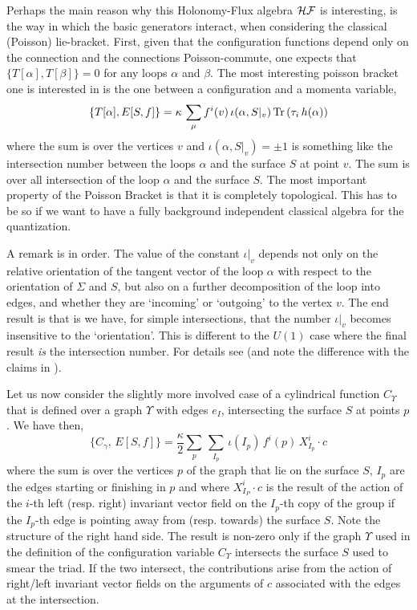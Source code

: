 \documentclass[aps,prd,tightenlines,showpacs,nofootinbib,preprint]{revtex4}
\def\be{\begin{equation}}
\def\ee{\end{equation}}
\def\g{{\gamma}}  \def\a{{\alpha}} \def\l{{\lambda}}
\begin{document}
Perhaps the main reason why this Holonomy-Flux  algebra
${\cal HF}$ is interesting, is the way in which the basic
generators interact, when considering the classical (Poisson)
lie-bracket. First, given that the configuration functions depend
only on the connection and the connections Poisson-commute, one
expects that $\{T[\a],T[\beta]\}=0$ for any loops $\a$ and
$\beta$. The most interesting poisson bracket one is interested in
is the one between a configuration and a momenta variable,
%
\be \{T[\a],E[S,f]\}= \kappa\,\sum_\mu
f^i(v)\,\iota(\a,S|_{v})\,{\rm Tr} \,(\tau_i\, h(\a))
\label{poissonB}
 \ee
%
where the sum is over the vertices $v$ and
$\iota(\a,S|_{v})=\pm 1$ is something like the
intersection number between the loops $\a$ and the surface $S$ at
point $v$. The sum is over all intersection of the loop $\a$
and the surface $S$. The most important property of the Poisson
Bracket is that it is completely topological. This has to be so if
we want to have a fully background independent classical algebra
for the quantization.

A remark is in order. The value of the constant $\iota|_{v}$
depends not only on the relative orientation of the tangent vector
of the loop $\a$ with respect to the orientation of $\Sigma$ and
$S$, but also on a further decomposition of the loop into edges,
and whether they are `incoming' or `outgoing' to the vertex
$v$. The end result is that is we have, for simple
intersections, that the number $\iota|_{v}$ becomes insensitive
to the `orientation'. This is different to the $U(1)$ case where
the final result {\it is} the intersection number. For details see
\cite{ACZ} (and note the difference with the claims in
\cite{Nicolai:2005mc}).

Let us now consider the slightly more involved case of a
cylindrical function $C_\Upsilon$ that is defined over a graph
$\Upsilon$ with edges $e_I$, intersecting the surface $S$ at
points $p$. We have then,
%
\be \{ C_\g, \, E[S,f] \} = \frac{\kappa}{2} \sum_{p}\,
\sum_{I_p}\, \iota({I_p})\, f^i(p)\, X^i_{I_p}\cdot c
\label{poissonbb}
 \ee
%
where the sum is over the vertices $p$ of the graph that lie on
the surface $S$, $I_p$ are the edges starting or finishing in $p$
and where $X^i_{I_P}\cdot c$ is the result of the action of the
$i$-th left (resp. right) invariant vector field on the $I_p$-th
copy of the group if the $I_p$-th edge is pointing away from
(resp. towards) the surface $S$.  Note the structure of the right
hand side. The result is non-zero only if the graph $\Upsilon$ used in
the definition of the configuration variable $C_\Upsilon$ intersects the
surface $S$ used to smear the triad. If the two intersect, the
contributions arise from the action of right/left invariant vector
fields on the arguments of $c$ associated with the edges at the
intersection.
\end{document}
